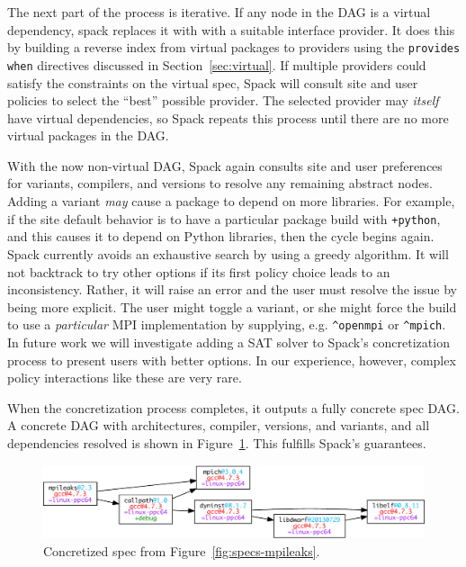 The next part of the process is iterative.
If any node in the DAG is a virtual dependency, spack replaces it with with a
suitable interface provider.  It does this by building a reverse
index from virtual packages to providers using the {\tt provides when} 
directives discussed in Section~\ref{sec:virtual}. If multiple providers
could satisfy the constraints on the virtual spec, 
Spack will consult site and user policies to select the ``best'' possible
provider.  The selected provider may {\it itself} have virtual dependencies,
so Spack repeats this process until there are no more virtual packages
in the DAG.

With the now non-virtual DAG, Spack again consults site and user preferences for 
variants, compilers, and versions to resolve any remaining abstract nodes.
Adding a variant {\it may} cause a package to depend on more libraries. For example,
if the site default behavior is to have a particular package build with {\tt +python},
and this causes it to depend on Python libraries, then the cycle begins again.
Spack currently avoids an exhaustive search by using a greedy algorithm.  
It will not backtrack to try other options if its first policy choice leads
to an inconsistency.  Rather, it will raise an error and the user must resolve
the issue by being more explicit.  The user might toggle a variant, or she might
force the build to use a {\it particular} MPI implementation
by supplying, e.g. \verb|^openmpi| or \verb|^mpich|.  In future
work we will investigate adding a SAT solver to Spack's concretization process
to present users with better options.  In our experience, however, complex policy
interactions like these are very rare.

When the concretization process completes, it outputs a fully concrete spec DAG. 
A concrete DAG with architectures, compiler, versions, and variants, and all 
dependencies resolved is shown in Figure~\ref{fig:specs-mpileaks-concrete}.
This fulfills Spack's guarantees.  

\begin{figure}
	\centering
	\includegraphics[width=\columnwidth]{specs/mpileaks-concrete.pdf}
	\caption{
		Concretized spec from Figure~\ref{fig:specs-mpileaks}.
		\label{fig:specs-mpileaks-concrete}
	}
\end{figure}

